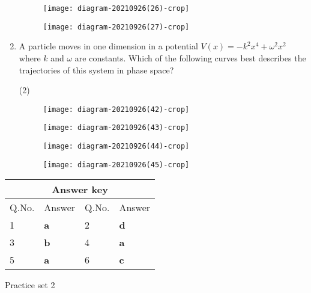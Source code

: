 \begin{enumerate}
\begin{tasks}
\begin{figure}[H]
		\centering
		\texttt{[image: diagram-20210926(26)-crop]}
	\end{figure}
	\task[\textbf{D.}]\begin{figure}[H]
		\centering
		\texttt{[image: diagram-20210926(27)-crop]}
	\end{figure}
\end{tasks}
	\item A particle moves in one dimension in a potential $V(x)=-k^{2} x^{4}+\omega^{2} x^{2}$ where $k$ and $\omega$ are constants. Which of the following curves best describes the trajectories of this system in phase space?
	{}
\begin{tasks}(2)
	\task[\textbf{A.}]\begin{figure}[H]
		\centering
		\texttt{[image: diagram-20210926(42)-crop]}
	\end{figure}
	\task[\textbf{B.}]\begin{figure}[H]
		\centering
		\texttt{[image: diagram-20210926(43)-crop]}
	\end{figure}
	\task[\textbf{C.}]\begin{figure}[H]
		\centering
		\texttt{[image: diagram-20210926(44)-crop]}
	\end{figure}
	\task[\textbf{D.}]\begin{figure}[H]
		\centering
		\texttt{[image: diagram-20210926(45)-crop]}
	\end{figure}
\end{tasks}
\end{enumerate}
\setlength\arrayrulewidth{1pt}
\begin{table}[H]
	\centering
	
	\begin{tabular}{|p{1.5cm}|p{1.5cm}||p{1.5cm}|p{1.5cm}|}
		\hline
		\multicolumn{4}{|c|}{\textbf{Answer key}}\\\hline\hline
		\rowcolor{ocrel}Q.No.&Answer&Q.No.&Answer\\\hline
		1&\textbf{a}&2&\textbf{d}\\\hline
		3&\textbf{b}&4&\textbf{a}\\\hline
		5&\textbf{a}&6&\textbf{c}\\\hline
	\end{tabular}
\end{table}
\newpage
\begin{abox}
	Practice set 2
	\end{abox}
